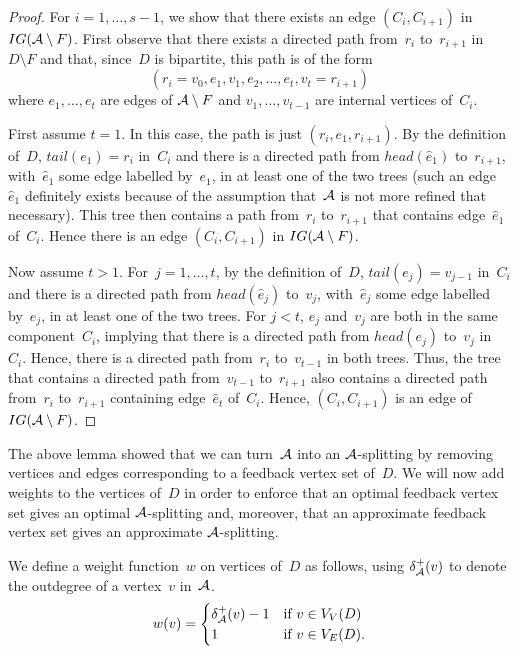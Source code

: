 \begin{proof}
For $i=1,\ldots ,s-1$, we show that there exists an edge $(C_i, C_{i+1})$ in $IG({\mathcal A} \setminus F)$. First observe that there exists a directed path from~$r_i$ to~$r_{i+1}$ in $D\setminus F$ and that, since~$D$ is bipartite, this path is of the form
\[
(r_i=v_0, e_1, v_1, e_2, \ldots ,e_t,v_t=r_{i+1})
\]
where $e_1,\ldots ,e_t$ are edges of ${\mathcal A} \setminus F$ and $v_1,\ldots ,v_{t-1}$ are internal vertices of~$C_i$.

First assume $t=1$. In this case, the path is just $(r_i, e_1,r_{i+1})$. By the definition of~$D$, $tail(e_1)=r_i$ in~$C_i$ and there is a directed path from $head(\hat{e}_1)$ to~$r_{i+1}$, with~$\hat{e}_1$ some edge labelled by~$e_1$, in at least one of the two trees (such an edge $\hat{e}_1$ definitely exists because of the assumption that~${\mathcal A}$ is not more refined that necessary). This tree then contains a path from~$r_i$ to~$r_{i+1}$ that contains edge~$\hat{e}_1$ of~$C_i$. Hence there is an edge $(C_i, C_{i+1})$ in $IG({\mathcal A} \setminus F)$.

Now assume $t>1$. For~$j=1,\ldots ,t$, by the definition of~$D$, $tail(e_j)=v_{j-1}$ in~$C_i$ and there is a directed path from $head(\hat{e}_j)$ to~$v_j$, with~$\hat{e}_j$ some edge labelled by~$e_j$, in at least one of the two trees. For $j<t$, $e_j$ and~$v_j$ are both in the same component~$C_i$, implying that there is a directed path from $head(e_j)$ to~$v_j$ in~$C_i$. Hence, there is a directed path from~$r_i$ to~$v_{t-1}$ in both trees. Thus, the tree that contains a directed path from~$v_{t-1}$ to~$r_{i+1}$ also contains a directed path from~$r_i$ to~$r_{i+1}$ containing edge~$\hat{e}_t$ of~$C_i$. Hence, $(C_i, C_{i+1})$ is an edge of $IG({\mathcal A} \setminus F)$.
\end{proof}

The above lemma showed that we can turn~${\mathcal A}$ into an ${\mathcal A}$-splitting by removing vertices and edges corresponding to a feedback vertex set of~$D$. We will now add weights to the vertices of~$D$ in order to enforce that an optimal feedback vertex set gives an optimal ${\mathcal A}$-splitting and, moreover, that an approximate feedback vertex set gives an approximate ${\mathcal A}$-splitting.

We define a weight function~$w$ on vertices of~$D$ as follows, using $\delta^+_{\mathcal A}(v)$ to denote the outdegree of a vertex~$v$ in~${\mathcal A}$.
\begin{displaymath}
  w(v) =
  \begin{cases}
    \delta^+_{\mathcal A}(v)-1 &\mbox{if } v \in V_V(D)\\
    1 				&\mbox{if } v \in V_E(D).
  \end{cases}
\end{displaymath}

